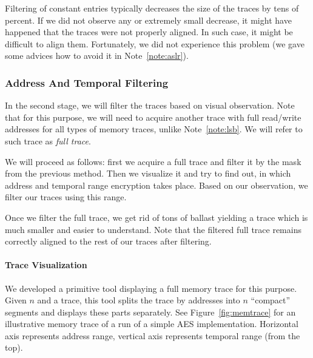 	\begin{note}
	\label{note:filter}
		Filtering of constant entries typically decreases the size of the traces by tens of percent. If we did not observe any or extremely small decrease, it might have happened that the traces were not properly aligned. In such case, it might be difficult to align them. Fortunately, we did not experience this problem (we gave some advices how to avoid it in Note~\ref{note:aslr}).
	\end{note}

\subsubsection{Address And Temporal Filtering}
\label{subsec:atf}
	
	In the second stage, we will filter the traces based on visual observation. Note that for this purpose, we will need to acquire another trace with full read/write addresses for all types of memory traces, unlike Note~\ref{note:lsb}. We will refer to such trace as {\em full trace}.
	
	We will proceed as follows: first we acquire a full trace and filter it by the mask from the previous method. Then we visualize it and try to find out, in which address and temporal range encryption takes place. Based on our observation, we filter our traces using this range.
	
	\begin{note}
	\label{note:fullfilter}
		Once we filter the full trace, we get rid of tons of ballast yielding a trace which is much smaller and easier to understand. Note that the filtered full trace remains correctly aligned to the rest of our traces after filtering.
	\end{note}
	
	\paragraph{Trace Visualization}
		
		We developed a primitive tool displaying a full memory trace for this purpose. Given $n$ and a trace, this tool splits the trace by addresses into $n$ ``compact'' segments and displays these parts separately. See Figure~\ref{fig:memtrace} for an illustrative memory trace of a run of a simple AES implementation. Horizontal axis represents address range, vertical axis represents temporal range (from the top).
		
